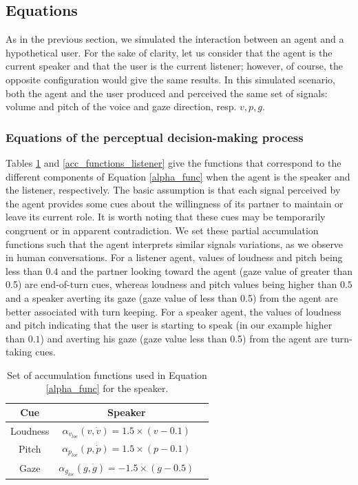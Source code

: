 \documentclass[twocolumn]{svjour3}
\begin{document}
\subsection{Equations}

As in the previous section, we simulated the interaction between an agent and a hypothetical user. For the sake of clarity, let us consider that the agent is the current speaker and that the user is the current listener; however, of course, the opposite configuration would give the same results. In this simulated scenario, both the agent and the user produced and perceived the same set of signals: volume and pitch of the voice and gaze direction, resp. $v,p,g$.

\subsubsection{Equations of the perceptual decision-making process}

Tables \ref{acc_functions_speaker} and \ref{acc_functions_listener} give the functions that correspond to the different components of Equation \ref{alpha_func} when the agent is the speaker and the listener, respectively. 
The basic assumption is that each signal perceived by the agent provides some cues about the willingness of its partner to maintain or leave its current role. It is worth noting that these cues may be temporarily congruent or in apparent contradiction.
We set these partial accumulation functions such that the agent interprets similar signals variations, as we observe in human conversations. For a listener agent, values of loudness and pitch being less than $0.4$ and the partner looking toward the agent (gaze value of greater than 0.5) are end-of-turn cues, whereas loudness and pitch values being higher than $0.5$ and a speaker averting its gaze (gaze value of less than 0.5) from the agent are better associated with turn keeping. For a speaker agent, the values of loudness and pitch indicating that the user is starting to speak (in our example higher than $0.1$) and averting his gaze (gaze value less than 0.5) from the agent are turn-taking cues.

\begin{table}
\centering
\begin{tabular}{|c|c|c|}
\hline
Cue & Speaker \\
\hline
Loudness & $\alpha_{v_{loc}}(v,\dot{v})=1.5\times (v-0.1)$ \\
\hline
Pitch & $\alpha_{p_{loc}}(p,\dot{p})=1.5\times (p-0.1)$ \\
\hline
Gaze & $\alpha_{g_{loc}}(g,\dot{g})=-1.5\times (g-0.5)$ \\
\hline
\end{tabular}
\caption{Set of accumulation functions used in Equation \ref{alpha_func} for the speaker.}
\label{acc_functions_speaker}
\end{table}
\end{document}
